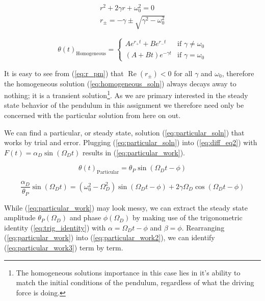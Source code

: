 \documentclass[notitlepage,aps,prd,nofootinbib]{revtex4-1}
\begin{document}
\begin{gather}
r^2 + 2 \gamma r + \omega_{0}^2 = 0 \label{eq:characteristic_eq} \\
r_{\pm} = -\gamma \pm \sqrt{\gamma^2 - \omega_{0}^2} \label{eq:r_pm}
\end{gather}

\begin{equation} \label{eq:homogeneous_soln}
\theta\left(t\right)_{\text{Homogeneous}} =
\begin{cases}
A e^{r_{+} t} + B e^{r_{-} t} & \text{if } \gamma \neq \omega_{0} \\
\left(A + B t\right) e^{-\gamma t} & \text{if } \gamma = \omega_{0}
\end{cases}
\end{equation}

It is easy to see from (\ref{eq:r_pm}) that $\operatorname{Re}\left(r_{\pm}\right) < 0$ for all $\gamma$ and $\omega_{0}$, therefore the homogeneous solution (\ref{eq:homogeneous_soln}) always decays away to nothing; it is a transient solution\footnote{The homogeneous solutions importance in this case lies in it's ability to match the initial conditions of the pendulum, regardless of what the driving force is doing.}. As we are primary interested in the steady state behavior of the pendulum in this assignment we therefore need only be concerned with the particular solution from here on out.

We can find a particular, or steady state, solution (\ref{eq:particular_soln}) that works by trial and error. Plugging (\ref{eq:particular_soln}) into (\ref{eq:diff_eq2}) with $F\left(t\right) = \alpha_{D} \sin\left(\Omega_{D} t\right)$ results in (\ref{eq:particular_work}).

\begin{equation} \label{eq:particular_soln}
\theta\left(t\right)_{\text{Particular}} = \theta_{P} \sin\left(\Omega_{D} t - \phi\right)
\end{equation}

\begin{equation} \label{eq:particular_work}
\frac{\alpha_{D}}{\theta_{P}} \sin\left(\Omega_{D} t\right) = \left(\omega_{0}^2 - \Omega_{D}^2\right) \sin\left(\Omega_{D} t - \phi\right) + 2 \gamma \Omega_{D} \cos\left(\Omega_{D} t - \phi\right)
\end{equation}

While (\ref{eq:particular_work}) may look messy, we can extract the steady state amplitude $\theta_{P}\left(\Omega_{D}\right)$ and phase $\phi\left(\Omega_{D}\right)$ by making use of the trigonometric identity (\ref{eq:trig_identity}) with $\alpha = \Omega_{D} t - \phi$ and $\beta = \phi$. Rearranging (\ref{eq:particular_work}) into (\ref{eq:particular_work2}), we can identify (\ref{eq:particular_work3}) term by term.
\end{document}
